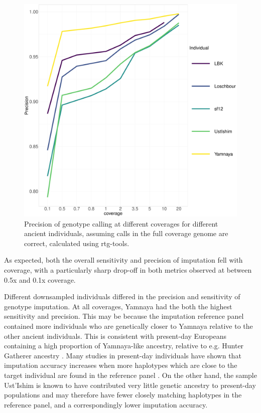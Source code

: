 \begin{figure}[htp]
    \centering
    \includegraphics[width=1.0\textwidth]{../images/chapter1/allDownsampled_rtgtools_Precision.pdf}
    \caption{Precision of genotype calling at different coverages for different ancient individuals, assuming calls in the full coverage genome are correct,  calculated using rtg-tools.}
    \label{fig:precision_downsampled_rtgtools}
\end{figure}

As expected, both the overall sensitivity and precision of imputation fell with coverage, with a particularly sharp drop-off in both metrics observed at between 0.5x and 0.1x coverage.

Different downsampled individuals differed in the precision and sensitivity of genotype imputation. At all coverages, Yamnaya had the both the highest sensitivity and precision. This may be because the imputation reference panel contained more individuals who are genetically closer to Yamnaya relative to the other ancient individuals. This is consistent with present-day Europeans containing a high proportion of Yamnaya-like ancestry, relative to e.g. Hunter Gatherer ancestry \cite{Haak2005}. Many studies in present-day individuals have shown that imputation accuracy increases when more haplotypes which are close to the target individual are found in the reference panel \cite{HUANG2009235, delaneau2018integrative}. On the other hand, the sample Ust'Ishim is known to have contributed very little genetic ancestry to present-day populations \cite{Prufer2014} and may therefore have fewer closely matching haplotypes in the reference panel, and a correspondingly lower imputation accuracy. 


